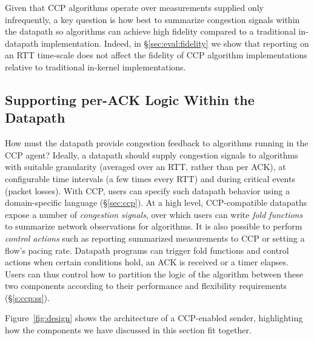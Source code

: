 Given that CCP algorithms operate over measurements supplied only infrequently, a key question is how best to summarize congestion signals within the datapath so algorithms can achieve high fidelity compared to a traditional in-datapath implementation.
Indeed, in \S\ref{sec:eval:fidelity} we show that reporting on an RTT time-scale does not affect the fidelity of CCP algorithm implementations relative to traditional in-kernel implementations.

\subsection{Supporting per-ACK Logic Within the Datapath}
\label{sec:design:exercising-control-over-datapath}
\label{sec:design:restricted-datapath-functions}

How must the datapath provide congestion feedback to algorithms running in the CCP agent?
Ideally, a datapath should supply congestion signals to algorithms with suitable granularity (\eg averaged over an RTT, rather than per ACK), at configurable time intervals (\eg a few times every RTT) and during critical events (\eg packet losses).
With CCP, users can specify such datapath behavior using a domain-specific language (\S\ref{sec:ccp}). 
At a high level, CCP-compatible datapaths expose a number of {\em congestion signals}, over which users can write {\em fold functions} to summarize network observations for algorithms. 
It is also possible to perform \emph{control actions} such as reporting summarized measurements to CCP or setting a flow's pacing rate. 
Datapath programs can trigger fold functions and control actions when certain conditions hold, \eg an ACK is received or a timer elapses.
Users can thus control how to partition the logic of the algorithm between these two components according to their performance and flexibility requirements (\S\ref{s:ccp:ss}).

Figure~\ref{fig:design} shows the architecture of a CCP-enabled sender, highlighting how the components we have discussed in this section fit together. 
